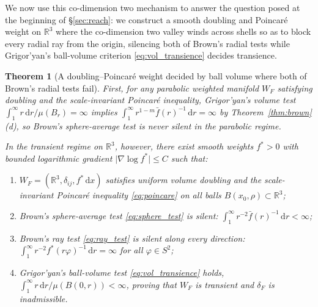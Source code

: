 \documentclass[a4paper,11pt,noarxiv]{quantumarticle}
\newcommand{\R}{\mathbb{R}}
\newcommand{\abs}[1]{\lvert #1\rvert}
\newcommand{\dd}{\,\mathrm{d}}
\newcommand{\grad}{\nabla}
\newcommand{\fbar}{\bar f}
\theoremstyle{plain}
\newtheorem{theorem}{Theorem}
\theoremstyle{definition}
\theoremstyle{remark}
\begin{document}
We now use this co-dimension two mechanism to answer the question posed
at the beginning of \S\ref{sec:reach}: we construct a smooth doubling
and Poincar\'e weight on $\R^3$ where the co-dimension two valley winds
across shells so as to block every radial ray from the origin, silencing
both of Brown's radial tests while Grigor'yan's ball-volume criterion
\eqref{eq:vol_transience} decides transience.

\begin{theorem}[A doubling--Poincar\'e weight decided by ball volume
where both of Brown's radial tests fail]\label{thm:blind_brown}
First, for any parabolic weighted manifold $W_F$ satisfying doubling and
the scale-invariant Poincar\'e inequality, Grigor'yan's volume test
$\int_1^\infty r\dd r/\mu(B_r)=\infty$ implies $\int_1^\infty r^{1-m}\fbar(r)^{-1}\dd r=\infty$
by Theorem~\ref{thm:brown}(d), so Brown's sphere-average test is never
silent in the parabolic regime.

In the transient regime on $\R^3$, however, there exist smooth weights
$f^*>0$ with bounded logarithmic gradient $\abs{\grad\log f^*}\le C$ such
that:
\begin{enumerate}[label=\textup{(\roman*)},leftmargin=2em,itemsep=2pt]
\item $W_F=(\R^3,\delta_{ij},f^*\dd x)$ satisfies uniform volume
doubling and the scale-invariant Poincar\'e inequality \eqref{eq:poincare}
on all balls $B(x_0,\rho)\subset\R^3$;
\item Brown's sphere-average test \eqref{eq:sphere_test} is silent:
$\int_1^\infty r^{-2}\fbar(r)^{-1}\dd r<\infty$;
\item Brown's ray test \eqref{eq:ray_test} is silent along \emph{every}
direction: $\int_1^\infty r^{-2}f^*(r\varphi)^{-1}\dd r=\infty$ for all
$\varphi\in S^2$;
\item Grigor'yan's ball-volume test \eqref{eq:vol_transience} holds,
$\int_1^\infty r\dd r/\mu(B(0,r))<\infty$, proving that $W_F$ is
transient and $\delta_F$ is inadmissible.
\end{enumerate}
\end{theorem}
\end{document}
